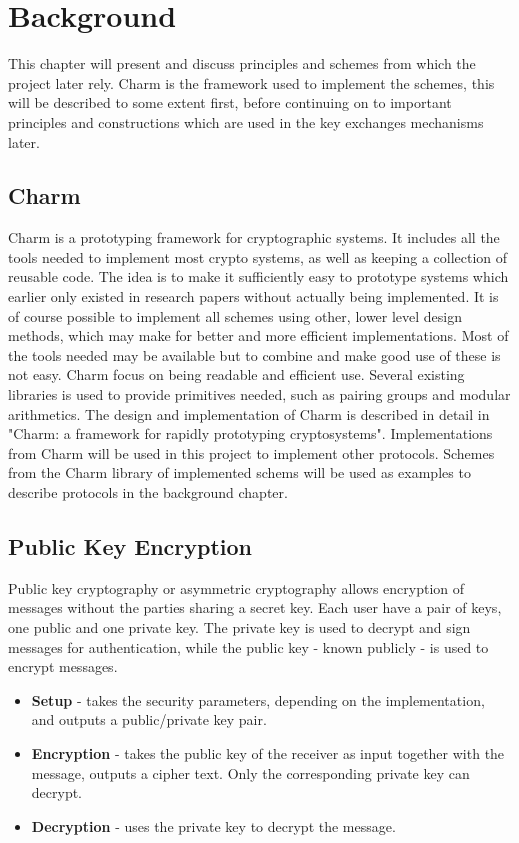 \chapter{Background}
\label{chp:background} 
This chapter will present and discuss principles and schemes from which the project later rely. Charm is the framework used to implement the schemes, this will be described to some extent first, before continuing on to important principles and constructions which are used in the key exchanges mechanisms later.

\section{Charm}
Charm\cite{DBLP:Charm13} is a prototyping framework for cryptographic systems. It includes all the tools needed to implement most crypto systems, as well as keeping a collection of reusable code. The idea is to make it sufficiently easy to prototype systems which earlier only existed in research papers without actually being implemented. It is of course possible to implement all schemes using other, lower level design methods, which may make for better and more efficient implementations. Most of the tools needed may be available but to combine and make good use of these is not easy. Charm focus on being readable and efficient use. Several existing libraries is used to provide primitives needed, such as pairing groups and modular arithmetics. The design and implementation of Charm is described in detail in "Charm: a framework for rapidly prototyping cryptosystems"\cite{DBLP:Charm13}. Implementations from Charm will be used in this project to implement other protocols. Schemes from the Charm library of implemented schems will be used as examples to describe protocols in the background chapter.

\section{Public Key Encryption}\label{sec:pke}
Public key cryptography or asymmetric cryptography allows encryption of messages without the parties sharing a secret key. Each user have a pair of keys, one public and one private key. The private key is used to decrypt and sign messages for authentication, while the public key - known publicly - is used to encrypt messages. 
\begin{itemize}
\item \textbf{Setup} - takes the security parameters, depending on the implementation, and outputs a public/private key pair.
\item \textbf{ Encryption } - takes the public key of the receiver as input together with the message, outputs a cipher text. Only the corresponding private key can decrypt.
\item \textbf{ Decryption } - uses the private key to decrypt the message.
\end{itemize}


